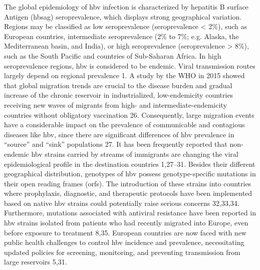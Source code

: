 The global epidemiology of \gls{hbv} infection is characterized by hepatitis B surface Antigen (\gls{hbsag}) seroprevalence, which displays strong geographical variation. Regions may be classified as low seroprevalence (seroprevalence < 2\%), such as European countries, intermediate seroprevalence (2\% to 7\%; e.g. Alaska, the Mediterranean basin, and India), or high seroprevalence (seroprevalence > 8\%), such as the South Pacific and countries of Sub-Saharan Africa. In high seroprevalence regions, \gls{hbv} is considered to be endemic. Viral transmission routes largely depend on regional prevalence 1. A study by the WHO in 2015 showed that global migration trends are crucial to the disease burden and gradual increase of the chronic reservoir in industrialized, low-endemicity countries receiving new waves of migrants from high- and intermediate-endemicity countries without obligatory vaccination 26. Consequently, large migration events have a considerable impact on the prevalence of communicable and contagious diseases like \gls{hbv}, since there are significant differences of \gls{hbv} prevalence in ``source'' and ``sink'' populations 27. It has been frequently reported that non-endemic \gls{hbv} strains carried by streams of immigrants are changing the viral epidemiological profile in the destination countries 1,27–31. Besides their different geographical distribution, genotypes of \gls{hbv} possess genotype-specific mutations in their open reading frames (\gls{orf}s). The introduction of these strains into countries where prophylaxis, diagnostic, and therapeutic protocols have been implemented based on native \gls{hbv} strains could potentially raise serious concerns 32,33,34. Furthermore, mutations associated with antiviral resistance have been reported in \gls{hbv} strains isolated from patients who had recently migrated into Europe, even before exposure to treatment 8,35. European countries are now faced with new public health challenges to control \gls{hbv} incidence and prevalence, necessitating updated policies for screening, monitoring, and preventing transmission from large reservoirs 5,31.\\

